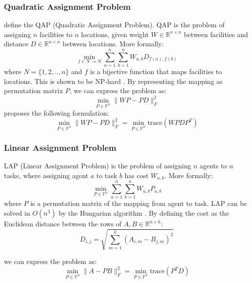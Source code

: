 \subsubsection{Quadratic Assignment Problem}
\cite{koopmans1957assignment} define the QAP (Quadratic Assignment Problem). QAP is the problem of assigning $n$ facilities to $n$ locations, given weight $W \in \mathds{R}^{n \times n}$ between facilities and distance $D \in \mathds{R}^{n \times n}$ between locations. More formally:
$$ \min_{f \in N \rightarrow N} \sum_{a=1}^n \sum_{b=1}^n W_{a, b} D_{f(a), f(b)} $$
where  $N = \{ 1, 2, .., n \}$ and $f$ is a bijective function that maps facilities to locations. This is shown to be NP-hard \citep{sahni1972qap}. By representing the mapping as permutation matrix $P$, we can express the problem as:
$$ \min_{P \in \mathds{P}^n} \lVert WP - PD \rVert_{F}^2 $$
\cite{edwards1980branch} proposes the following formulation:
\begin{equation}\label{qap_trace_rewrite}
\min_{P \in \mathds{P}^n} \lVert WP - PD \rVert_{F}^2 = \min_{P \in \mathds{P}^n} \text{trace}(WPDP^T)
\end{equation}

\subsubsection{Linear Assignment Problem}
LAP (Linear Assignment Problem) is the problem of assigning $n$ agents to $n$ tasks, where assigning agent $a$ to task $b$ has cost $W_{a,b}$. More formally:
\begin{equation}\label{lap_sum}
    \min_{P \in \mathds{P}^n} \sum_{a=1}^n \sum_{b=1}^n W_{a, b} P_{a,b}
\end{equation}
where $P$ is a permutation matrix of the mapping from agent to task. LAP can be solved in $O(n^3)$ by the Hungarian algorithm \citep{kuhn1955hungarian}. By defining the cost as the Euclidean distance between the rows of $A, B \in \mathds{R}^{n \times k}$:
\begin{equation}\label{euclidean_distance_matrix}
D_{i,j} = \sqrt{\sum^k_{m = 1} (A_{i, m} - B_{j, m})^2}
\end{equation}

we can express the problem as:
\begin{equation}\label{lap_trace_rep}
     \min_{P \in \mathds{P}^n} \lVert A - PB \rVert_{F}^2 = \min_{P \in \mathds{P}^n} \text{trace}(P^TD)
\end{equation}

